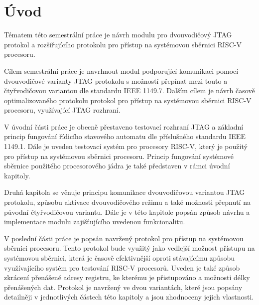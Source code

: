 \chapter*{Úvod}
{}

Tématem této semestrální práce je návrh modulu pro dvouvodičový \acs{JTAG} protokol a rozšiřujícího protokolu pro přístup na systémovou sběrnici \acs{RISC-V} procesoru.

Cílem semestrální práce je navrhnout modul podporující komunikaci pomocí dvouvodičové varianty \acs{JTAG} protokolu s možností přepínat mezi touto a čtyřvodičovou variantou dle standardu IEEE 1149.7. Dalším cílem je návrh časově optimalizovaného protokolu protokol pro přístup na systémovou sběrnici \acs{RISC-V} procesoru, využívající \acs{JTAG} rozhraní.

V úvodní části práce je obecně přestaveno testovací rozhraní \acs{JTAG} a základní princip fungování řídicího stavového automatu dle příslušného standardu IEEE 1149.1. Dále je uveden testovací systém pro procesory \acs{RISC-V}, který je použitý pro přístup na systémovou sběrnici procesoru. Princip fungování systémové sběrnice použitého procesorového jádra je také představen v rámci úvodní kapitoly.

Druhá kapitola se věnuje principu komunikace dvouvodičovou variantou \acs{JTAG} protokolu, způsobu aktivace dvouvodičového režimu a také možnosti přepnutí na původní čtyřvodičovou variantu. Dále je v této kapitole popsán způsob návrhu a implementace modulu zajišťujícího uvedenou funkcionalitu.

V poslední části práce je popsán navržený protokol pro přístup na systémovou sběrnici procesoru. Tento protokol bude využitý jako vedlejší možnost přístupu na systémovou sběrnici, která je časově efektivnější oproti stávajícímu způsobu využívajícího systém pro testování \acs{RISC-V} procesorů. Uveden je také způsob zkrácení přenášené adresy registru, ke kterému je přistupováno a možnosti délky přenášených dat. Protokol je navržený ve dvou variantách, které jsou popsány detailněji v jednotlivých částech této kapitoly a jsou zhodnoceny jejich vlastnosti.

